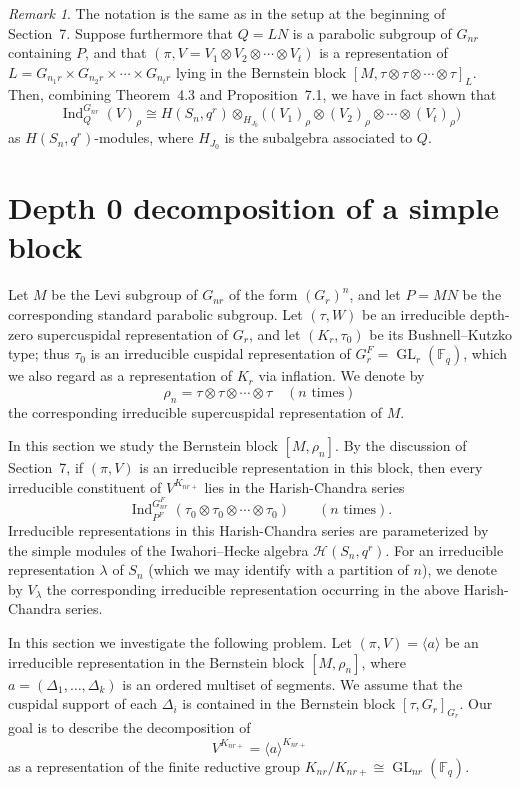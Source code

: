 \documentclass[12pt]{article}
\theoremstyle{remark}
\newtheorem{remark}[theorem]{Remark}
\begin{document}
\begin{remark}
The notation is the same as in the setup at the beginning of Section~7. Suppose furthermore that $Q = LN$ is a parabolic subgroup of $G_{nr}$ containing $P$, and that $(\pi,V=V_1 \otimes V_2 \otimes \cdots \otimes V_t)$ is a representation of $L=G_{n_1r }\times G_{n_2r}\times \cdots \times G_{n_t r}$ lying in the Bernstein block $[M,\tau \otimes \tau \otimes \cdots \otimes \tau]_L$. Then, combining Theorem~4.3 and Proposition~7.1, we have in fact shown that
$$
\operatorname{Ind}_Q^{G_{nr}}(V)_\rho \cong H(S_n,q^r) \otimes_{H_{J_0}} \bigl( (V_1)_\rho \otimes (V_2)_\rho \otimes \cdots \otimes (V_t)_\rho \bigr)
$$
as $H(S_n,q^r)$-modules, where $H_{J_0}$ is the subalgebra associated to $Q$.
\end{remark}

\section{Depth 0 decomposition of a simple block}
Let $M$ be the Levi subgroup of $G_{nr}$ of the form $(G_r)^n$, and let $P = MN$ be the corresponding standard parabolic subgroup. Let $(\tau, W)$ be an irreducible depth-zero supercuspidal representation of $G_r$, and let $(K_r, \tau_0)$ be its Bushnell--Kutzko type; thus $\tau_0$ is an irreducible cuspidal representation of $G_r^F = \operatorname{GL}_r(\mathbb{F}_q)$, which we also regard as a representation of $K_r$ via inflation. We denote by
\[
\rho_n = \tau \otimes \tau \otimes \cdots \otimes \tau \quad (n \text{ times})
\]
the corresponding irreducible supercuspidal representation of $M$.

In this section we study the Bernstein block $[M, \rho_n]$. By the discussion of Section~7, if $(\pi, V)$ is an irreducible representation in this block, then every irreducible constituent of $V^{K_{nr+}}$ lies in the Harish-Chandra series
\[
\operatorname{Ind}_{P^F}^{G_{nr}^F} (\tau_0 \otimes \tau_0 \otimes \cdots \otimes \tau_0) \qquad (n \text{ times}).
\]
Irreducible representations in this Harish-Chandra series are parameterized by the simple modules of the Iwahori--Hecke algebra $\mathcal{H}(S_n, q^r)$. For an irreducible representation $\lambda$ of $S_n$ (which we may identify with a partition of $n$), we denote by $V_\lambda$ the corresponding irreducible representation occurring in the above Harish-Chandra series.

In this section we investigate the following problem. Let $(\pi, V) = \langle a \rangle$ be an irreducible representation in the Bernstein block $[M, \rho_n]$, where $a = (\Delta_1, \dots, \Delta_k)$ is an ordered multiset of segments. We assume that the cuspidal support of each $\Delta_i$ is contained in the Bernstein block $[\tau, G_r]_{G_r}$. Our goal is to describe the decomposition of 
$$
V^{K_{nr+}} = \langle a \rangle^{K_{nr+}}
$$
as a representation of the finite reductive group $K_{nr}/K_{nr+} \cong \operatorname{GL}_{nr}(\mathbb{F}_q)$.
\end{document}

